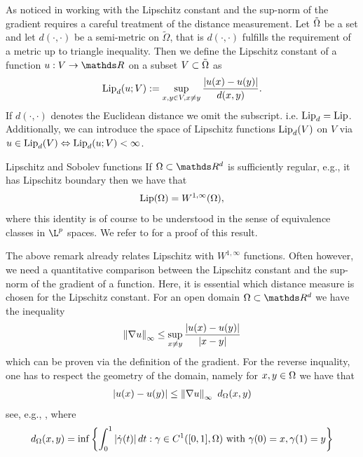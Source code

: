 As noticed in \cite{jensen1993uniqueness} working with the Lipschitz constant and the sup-norm of the gradient requires a careful 
treatment of the distance measurement. Let $\tilde{\Omega}$ be a set and let $d(\cdot,\cdot)$ be a semi-metric on $\tilde\Omega$, that is $d(\cdot,\cdot)$ fulfills 
the requirement of a metric up to triangle inequality. Then we define the Lipschitz constant of a function $u:V\to \R$ on a subset $V\subset \tilde{\Omega}$ as
%
\begin{align*}
\operatorname{Lip}_d(u; V):= \sup_{x,y\in V, x\neq y} \frac{\left|u(x) - u(y)\right|}{d(x,y)}.
\end{align*}
%
If $d(\cdot,\cdot)$ denotes the Euclidean distance we omit the subscript. i.e. $\operatorname{Lip}_d = \operatorname{Lip}$. Additionally, we can 
introduce the space of Lipschitz functions $\operatorname{Lip}_d(V)$ on $V$ via 
$u\in \operatorname{Lip}_d(V) \Leftrightarrow \operatorname{Lip}_d(u;V) <\infty$.
%
\begin{remark}{Lipschitz and Sobolev functions}{}
If $\domain\subset\R^d$ is sufficiently regular, e.g., it has Lipschitz boundary then we have that
%
\begin{align*}
\operatorname{Lip}(\Omega) = W^{1,\infty}(\Omega),
\end{align*}
%
where this identity is of course to be understood in the sense of equivalence classes in $\L^p$ spaces. We refer to \cite{evans2018measure} for a proof of this result.
\end{remark}
%
The above remark already relates Lipschitz with $W^{1,\infty}$ functions. Often however, we need a quantitative 
comparison between the Lipschitz constant and the sup-norm of the gradient of a function. Here, it is essential 
which distance measure is chosen for the Lipschitz constant. For an open domain $\domain\subset\R^d$ we have the inequality
%
\begin{align*}
\left\|\nabla u\right\|_\infty \leq \sup_{x\neq y} \frac{\left|u(x) - u(y)\right|}{\left|x-y\right|}
\end{align*}
%
which can be proven via the definition of the gradient. For the reverse inquality, one has to respect the 
geometry of the domain, namely for $x,y\in\Omega$ we have that
%
\begin{align}\label{eq:LipGrad}
\left|u(x) - u(y)\right| \leq \left\|\nabla u\right\|_\infty\ d_\Omega(x,y)
\end{align}
%
see, e.g., \cite[Prop9.3, Rem. 7]{brezis2011functional}, where
%
\begin{align*}
d_\Omega(x,y) = \inf \left\{
\int_0^1 \left|\dot{\gamma}(t)\right| dt : \gamma\in C^1([0,1], \Omega)\text{ with } \gamma(0)=x, \gamma(1) =y
\right\}
\end{align*}

